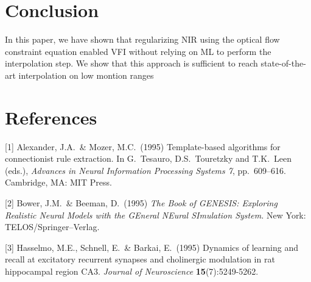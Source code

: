 \documentclass{article}
\begin{document}
\section{Conclusion}

In this paper, we have shown that regularizing NIR using the optical flow constraint equation
enabled VFI without relying on ML to perform the interpolation step.
We show that this approach is sufficient to reach state-of-the-art interpolation
on low montion ranges

\section*{References}

\medskip

{
\small


[1] Alexander, J.A.\ \& Mozer, M.C.\ (1995) Template-based algorithms for
connectionist rule extraction. In G.\ Tesauro, D.S.\ Touretzky and T.K.\ Leen
(eds.), {\it Advances in Neural Information Processing Systems 7},
pp.\ 609--616. Cambridge, MA: MIT Press.


[2] Bower, J.M.\ \& Beeman, D.\ (1995) {\it The Book of GENESIS: Exploring
  Realistic Neural Models with the GEneral NEural SImulation System.}  New York:
TELOS/Springer--Verlag.


[3] Hasselmo, M.E., Schnell, E.\ \& Barkai, E.\ (1995) Dynamics of learning and
recall at excitatory recurrent synapses and cholinergic modulation in rat
hippocampal region CA3. {\it Journal of Neuroscience} {\bf 15}(7):5249-5262.
}
\end{document}
